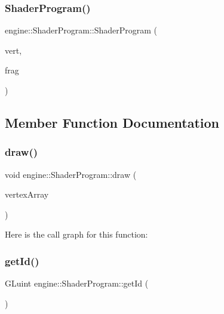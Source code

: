\subsubsection{\texorpdfstring{Shader\+Program()}{ShaderProgram()}}
{\footnotesize\ttfamily engine\+::\+Shader\+Program\+::\+Shader\+Program (\begin{DoxyParamCaption}\item[{std\+::string}]{vert,  }\item[{std\+::string}]{frag }\end{DoxyParamCaption})}



\subsection{Member Function Documentation}
\mbox{\label{classengine_1_1_shader_program_a3da1f3d00e40dda138043904f26dd131}} 
\subsubsection{\texorpdfstring{draw()}{draw()}}
{\footnotesize\ttfamily void engine\+::\+Shader\+Program\+::draw (\begin{DoxyParamCaption}\item[{\mbox{\hyperlink{classengine_1_1_vertex_array}{Vertex\+Array}} \&}]{vertex\+Array }\end{DoxyParamCaption})}

Here is the call graph for this function\+:
\mbox{\label{classengine_1_1_shader_program_ab5816c47f12daf714140b952daf3650a}} 
\subsubsection{\texorpdfstring{get\+Id()}{getId()}}
{\footnotesize\ttfamily G\+Luint engine\+::\+Shader\+Program\+::get\+Id (\begin{DoxyParamCaption}{ }\end{DoxyParamCaption})}

\mbox{\label{classengine_1_1_shader_program_ad2b22cfa943ff357f15829e52021fa4d}} 
